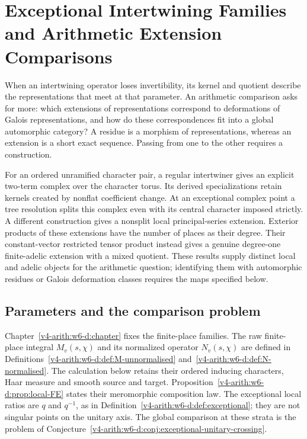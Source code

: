 \chapter{Exceptional Intertwining Families and Arithmetic Extension Comparisons}
\label{v4-arith:w10-d:chapter}

When an intertwining operator loses invertibility, its kernel and
quotient describe the representations that meet at that parameter.
An arithmetic comparison asks for more: which extensions of
representations correspond to deformations of Galois representations,
and how do these correspondences fit into a global automorphic
category? A residue is a morphism of representations, whereas an
extension is a short exact sequence. Passing from one to the other
requires a construction.

For an ordered unramified character pair, a regular intertwiner gives
an explicit two-term complex over the character torus. Its derived
specializations retain kernels created by nonflat coefficient change.
At an exceptional complex point a tree resolution splits this complex
even with its central character imposed strictly. A different
construction gives a nonsplit local principal-series extension.
Exterior products of these extensions have the number of places as
their degree. Their constant-vector restricted tensor product instead
gives a genuine degree-one finite-adelic extension with a mixed
quotient. These results supply distinct local and adelic objects for
the arithmetic question; identifying them with automorphic residues
or Galois deformation classes requires the maps specified below.

\section{Parameters and the comparison problem}
\label{v4-arith:w10-d:domain}
Chapter~\ref{v4-arith:w6-d:chapter} fixes the finite-place families.
The raw finite-place integral $M_v(s,\chi)$ and its normalized
operator $N_v(s,\chi)$ are defined in
Definitions~\ref{v4-arith:w6-d:def:M-unnormalised}
and~\ref{v4-arith:w6-d:def:N-normalised}. The calculation below
retains their ordered inducing characters, Haar measure and smooth
source and target. Proposition~\ref{v4-arith:w6-d:prop:local-FE}
states their meromorphic composition law. The exceptional local ratios are $q$ and $q^{-1}$,
as in Definition~\ref{v4-arith:w6-d:def:exceptional}; they are not
singular points on the unitary axis. The global comparison at these
strata is the problem of
Conjecture~\ref{v4-arith:w6-d:conj:exceptional-unitary-crossing}.

